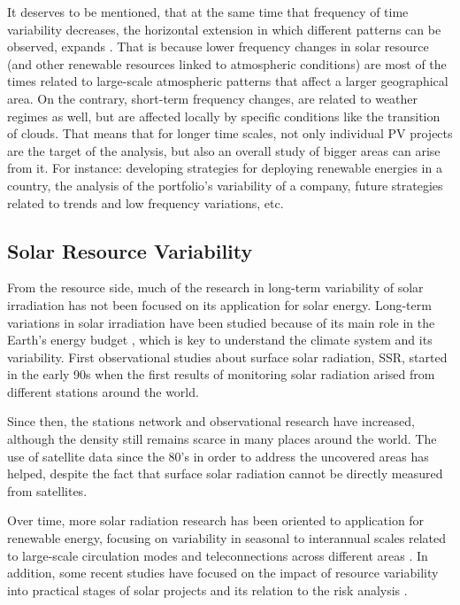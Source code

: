 It deserves to be mentioned, that at the same time that frequency of time variability decreases, the horizontal extension in which different patterns can be observed, expands \cite*{Engeland2017}. That is because lower frequency changes in solar resource (and other renewable resources linked to atmospheric conditions) are most of the times related to large-scale atmospheric patterns that affect a larger geographical area. On the contrary, short-term frequency changes, are related to weather regimes as well, but are affected locally by specific conditions like the transition of clouds. That means that for longer time scales, not only individual PV projects are the target of the analysis, but also an overall study of bigger areas can arise from it. For instance: developing strategies for deploying renewable energies in a country, the analysis of the portfolio's variability of a company, future strategies related to trends and low frequency variations, etc. 
  
\subsection{Solar Resource Variability}

From the resource side, much of the research in long-term variability of solar irradiation has not been focused on its application for solar energy. Long-term variations in solar irradiation have been studied because of its main role in the Earth's energy budget \cite*{Wild2012}, which is key to understand the climate system and its variability. First observational studies about surface solar radiation, SSR, started in the early 90s \cite*{Ohmura, Dutton2006} when the first results of monitoring solar radiation arised from different stations around the world.

Since then, the stations network and observational research have increased, although the density still remains scarce in many places around the world. The use of satellite data since the 80's in order to address the uncovered areas has helped, despite the fact that surface solar radiation cannot be directly measured from satellites.  

Over time, more solar radiation research has been oriented to application for renewable energy, focusing on variability in seasonal to interannual scales related to large-scale circulation modes and teleconnections across different areas \cite*{Davy2012, Jerez2013, Jerez2013a}.  In addition, some recent studies have focused on the impact of resource variability into practical stages of solar projects and its relation to the risk analysis \cite*{Bryce2018}.

